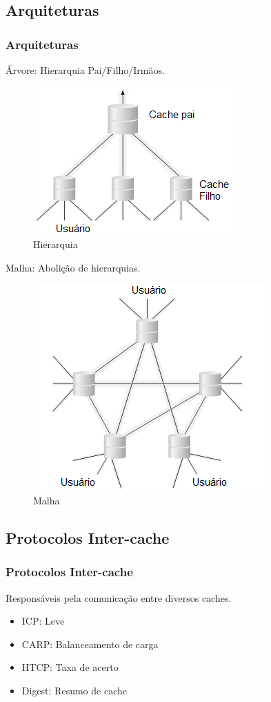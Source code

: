 \documentclass{beamer}
\begin{document}
   \subsection{Arquiteturas}
    \begin{frame}
      \frametitle{Arquiteturas}
      Árvore: Hierarquia Pai/Filho/Irmãos.\\
      \begin{figure}
       \centering
       \includegraphics[scale=0.3]{imagens/hierarquia.png}
       \caption{Hierarquia}
      \end{figure}

      Malha: Abolição de hierarquias.

      \begin{figure}
       \centering
       \includegraphics[scale=0.3]{imagens/mesh.png}
       \caption{Malha}
      \end{figure}
  
    \end{frame}

    \subsection{Protocolos Inter-cache}
    \begin{frame}
      \frametitle{Protocolos Inter-cache}
      Responsáveis pela comunicação entre diversos caches.
      \begin{itemize}
       \item ICP: Leve
       \item CARP: Balanceamento de carga
       \item HTCP: Taxa de acerto
       \item Digest: Resumo de cache
      \end{itemize} 
    \end{frame} 
\end{document}

